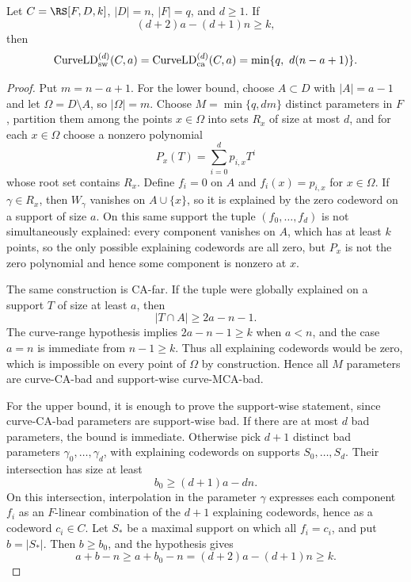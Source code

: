 \begin{theorem}
\label{thm:curve-tangent-staircase}
Let \(C=\RS[F,D,k]\), \(|D|=n\), \(|F|=q\), and \(d\ge1\).  If
\[
  (d+2)a-(d+1)n\ge k,
\]
then
\[
  \operatorname{CurveLD}_{\rm sw}^{(d)}(C,a)
  =
  \operatorname{CurveLD}_{\rm ca}^{(d)}(C,a)
  =
  \min\{q,\ d(n-a+1)\}.
\]
\end{theorem}

\begin{proof}
Put \(m=n-a+1\).  For the lower bound, choose \(A\subset D\) with
\(|A|=a-1\) and let \(\Omega=D\setminus A\), so \(|\Omega|=m\).  Choose
\(M=\min\{q,dm\}\) distinct parameters in \(F\), partition them among the
points \(x\in\Omega\) into sets \(R_x\) of size at most \(d\), and for each
\(x\in\Omega\) choose a nonzero polynomial
\[
  P_x(T)=\sum_{i=0}^d p_{i,x}T^i
\]
whose root set contains \(R_x\).  Define \(f_i=0\) on \(A\) and
\(f_i(x)=p_{i,x}\) for \(x\in\Omega\).  If \(\gamma\in R_x\), then
\(W_\gamma\) vanishes on \(A\cup\{x\}\), so it is explained by the zero codeword
on a support of size \(a\).  On this same support the tuple
\((f_0,\ldots,f_d)\) is not simultaneously explained: every component vanishes
on \(A\), which has at least \(k\) points, so the only possible explaining
codewords are all zero, but \(P_x\) is not the zero polynomial and hence some
component is nonzero at \(x\).

The same construction is CA-far.  If the tuple were globally explained on a
support \(T\) of size at least \(a\), then
\[
  |T\cap A|\ge 2a-n-1.
\]
The curve-range hypothesis implies \(2a-n-1\ge k\) when \(a<n\), and the case
\(a=n\) is immediate from \(n-1\ge k\).  Thus all explaining codewords would be
zero, which is impossible on every point of \(\Omega\) by construction.  Hence
all \(M\) parameters are curve-CA-bad and support-wise curve-MCA-bad.

For the upper bound, it is enough to prove the support-wise statement, since
curve-CA-bad parameters are support-wise bad.  If there are at most \(d\) bad
parameters, the bound is immediate.  Otherwise pick \(d+1\) distinct bad
parameters \(\gamma_0,\ldots,\gamma_d\), with explaining codewords on supports
\(S_0,\ldots,S_d\).  Their intersection has size at least
\[
  b_0\ge (d+1)a-dn .
\]
On this intersection, interpolation in the parameter \(\gamma\) expresses each
component \(f_i\) as an \(F\)-linear combination of the \(d+1\) explaining
codewords, hence as a codeword \(c_i\in C\).  Let \(S_*\) be a maximal support
on which all \(f_i=c_i\), and put \(b=|S_*|\).  Then
\(b\ge b_0\), and the hypothesis gives
\[
  a+b-n\ge a+b_0-n=(d+2)a-(d+1)n\ge k .
\]


\end{proof}
